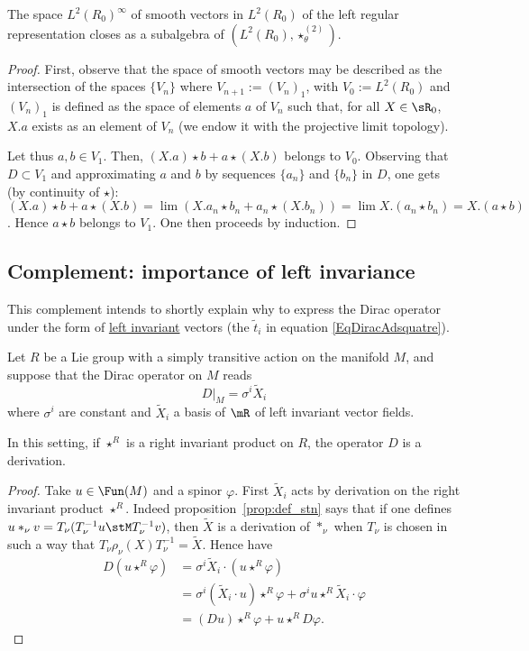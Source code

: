 \begin{proposition}
	The space $L^2(R_0)^{\infty}$ of smooth vectors in $L^2(R_0)$ of the left regular representation closes as a subalgebra of $(L^2(R_0),\star^{(2)}_\theta)$.
\end{proposition}

\begin{proof}
	First, observe that the space of smooth vectors may be described  as the intersection of the spaces $\{V_n\}$ where  $V_{n+1}:=(V_n)_1$,   with $V_0:=L^2(R_0)$ and $(V_n)_1$ is defined as the space of elements $a$ of $V_n$ such that, for all $X\in\sR_0$, $X.a$ exists as an element of $V_n$ (we endow it with the projective limit topology).                             %

	Let thus $a,b\in V_1$. Then, $(X.a)\star b+a\star(X.b)$ belongs to $V_0$.  Observing that $D \subset V_1$ and approximating $a$ and $b$ by sequences $\{a_n\}$ and $\{b_n\}$ in $D $, one gets (by continuity of $\star$): $(X.a)\star b+a\star(X.b)=\lim(X.a_n\star b_n+a_n\star(X.b_n))= \lim X.(a_n\star b_n)=X.(a\star b)$. Hence $a\star b$ belongs to $V_1$.  One then proceeds by induction.
\end{proof}

\subsection{Complement: importance of left invariance}
\label{subsecImpLeftInvarDstar}

This complement intends to shortly explain why to express the Dirac operator under the form of \hyperlink{HyperDefLeftInvar}{left invariant} vectors (the $\tilde t_i$ in equation \eqref{EqDiracAdsquatre}).

Let $R$ be a Lie group with a simply transitive action on the manifold $M$, and suppose that the Dirac operator on $M$ reads
\[
	D|_M=\sigma^i\tilde X_i
\]
where $\sigma^i$ are constant and $\tilde X_i$ a basis of $\mR$ of left invariant vector fields.

\begin{proposition}
	In this setting, if $\star^R$ is a right invariant product on $R$, the operator $D$ is a derivation.
\end{proposition}

\begin{proof}
	Take $u\in\Fun(M)$ and a spinor $\varphi$. First $\tilde X_i$ acts by derivation on the right invariant product $\star^R$. Indeed proposition~\ref{prop:def_stn} says that if one defines $u\ast_{\nu} v=T_{\nu}(T_{\nu}^{-1}u\stM T_{\nu}^{-1}v)$, then $\tilde X$ is a derivation of $\ast_{\nu}$ when $T_{\nu}$ is chosen in such a way that $T_{\nu}\rho_{\nu}(X)T_{\nu}^{-1}=\tilde X$. Hence have
	\[
		\begin{split}
			D(u\star^R\varphi)&=\sigma^i\tilde X_i\cdot(u\star^R\varphi)\\
			&=\sigma^i(\tilde X_i\cdot u)\star^R\varphi+\sigma^i u\star^R\tilde X_i\cdot \varphi\\
			&=(Du)\star^R\varphi+u\star^R D\varphi.
		\end{split}
	\]

\end{proof}

